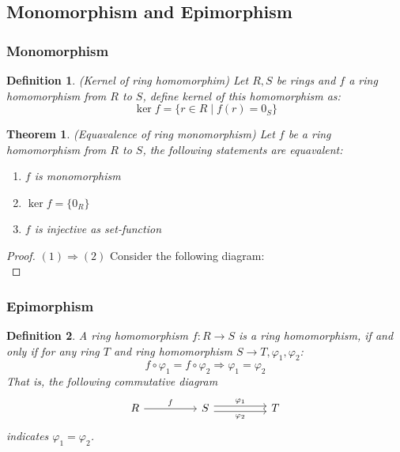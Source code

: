 \documentclass[a4paper, pdf, 11.5pt]{article}
\newtheorem{definition}{Definition}
\newtheorem{theorem}{Theorem}
\begin{document}
\subsection{Monomorphism and Epimorphism}
\subsubsection{Monomorphism}
\begin{definition}(Kernel of ring homomorphim)
Let $R, S$ be rings and $f$ a ring homomorphism from $R$ to $S$, define kernel of this homomorphism as:
$$
\ker f=\{r\in R\mid f(r) = 0_{S}\}
$$
\end{definition}
\vspace{0.3cm}
\begin{theorem}(Equavalence of ring monomorphism)
Let $f$ be a ring homomorphism from $R$ to $S$, the following statements are equavalent: 
\begin{enumerate}
  \item  $f$ is monomorphism 
  \item  $\ker f=\{0_{R}\}$
  \item  $f$ is injective as set-function
\end{enumerate}
\end{theorem}
\begin{proof}
  $(1)\Rightarrow(2)$ Consider the following diagram:
  $$
  $$
  
\end{proof}
\subsubsection{Epimorphism}
\vspace{0.3cm}
\begin{definition}
A ring homomorphism $f:R\rightarrow S$ is a ring homomorphism, if and only if for any ring $T$ and ring homomorphism $S\rightarrow T, \varphi_1, \varphi_2$:
$$
f\circ \varphi_1 = f\circ \varphi_2\Longrightarrow \varphi_1 = \varphi_2 
$$
That is, the following commutative diagram
$$
\begin{tikzcd}[column sep=huge]
  R \arrow[r, "f"] & S \arrow[r, "\varphi_1", shift left] \arrow[r, "\varphi_2"', shift right] & T
\end{tikzcd}
$$
indicates $\varphi_1 = \varphi_2$. 
\end{definition}
\end{document}

